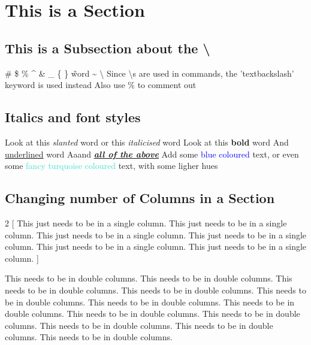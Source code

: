 \documentclass[12pt,twoside,a4paper]{article}
\begin{document}
\section*{This is a Section}

\subsection*{This is a Subsection about the \textbackslash}

\# \$ \% \^{} \& \_ \{ \} \~word \~{} \textbackslash
\newline \newline Since \textbackslash s are used in commands, the 'textbackslash' keyword is used instead
\newline Also use \% to comment out %

\subsection*{Italics and font styles}
Look at this \textsl{slanted} word
\newline or this \textit{italicised} word %
\newline Look at this \textbf{bold} word \newline And \underline{underlined} word
\newline Aaand \textbf{\textit{\underline{all of the above}}}
\newline \newline Add some \textcolor{blue}{blue coloured} text, or even some
\textcolor{Turquoise}{fancy turquoise coloured} text, with some
\textcolor{TurquoiseLighter2}{ligher hues}
\newpage

\subsection*{Changing number of Columns in a Section}
\begin{multicols}{2}
  [
\newline This just needs to be in a single column. This just needs to be in a single column. This just needs to be in a single column. This just needs to be in a single column. This just needs to be in a single column. This just needs to be in a single column.
]

\newline \noindent This needs to be in double columns. This needs to be in double columns.
\newline This needs to be in double columns. This needs to be in double columns.
\newline This needs to be in double columns. This needs to be in double columns.
\newline This needs to be in double columns. This needs to be in double columns.
\newline This needs to be in double columns. This needs to be in double columns.
\newline This needs to be in double columns. This needs to be in double columns.

\end{multicols}
\end{document}
